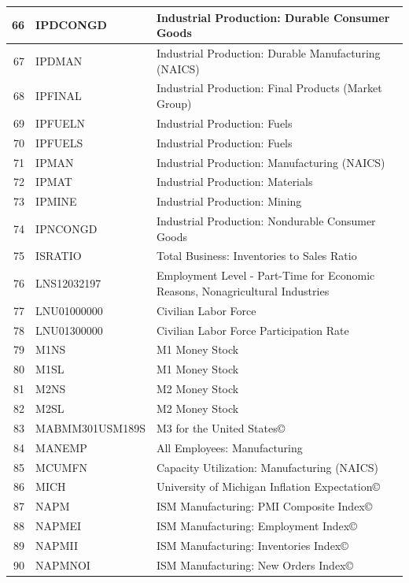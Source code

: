 \documentclass[12pt]{article}
\begin{document}
\begin{table}[ht]
\label{fred data 4}
\centering
\begin{tabular}{r|p{4cm}p{11cm}}
	\hline
	66 & IPDCONGD & Industrial Production: Durable Consumer Goods \\ 
	\hline
	67 & IPDMAN & Industrial Production: Durable Manufacturing (NAICS) \\ 
	\hline
	68 & IPFINAL & Industrial Production: Final Products (Market Group) \\ 
	\hline
	69 & IPFUELN & Industrial Production: Fuels \\ 
	\hline
	70 & IPFUELS & Industrial Production: Fuels \\ 
	\hline
	71 & IPMAN & Industrial Production: Manufacturing (NAICS) \\ 
	\hline
	72 & IPMAT & Industrial Production: Materials \\ 
	\hline
	73 & IPMINE & Industrial Production: Mining \\ 
	\hline
	74 & IPNCONGD & Industrial Production: Nondurable Consumer Goods \\ 
	\hline
	75 & ISRATIO & Total Business: Inventories to Sales Ratio \\ 
	\hline
	76 & LNS12032197 & Employment Level - Part-Time for Economic Reasons, Nonagricultural Industries \\ 
	\hline
	77 & LNU01000000 & Civilian Labor Force \\ 
	\hline
	78 & LNU01300000 & Civilian Labor Force Participation Rate \\ 
	\hline
	79 & M1NS & M1 Money Stock \\ 
	\hline
	80 & M1SL & M1 Money Stock \\ 
	\hline
	81 & M2NS & M2 Money Stock \\ 
	\hline
	82 & M2SL & M2 Money Stock \\ 
	\hline
	83 & MABMM301USM189S & M3 for the United States© \\ 
	\hline
	84 & MANEMP & All Employees: Manufacturing \\ 
	\hline
	85 & MCUMFN & Capacity Utilization: Manufacturing (NAICS) \\ 
	\hline
	86 & MICH & University of Michigan Inflation Expectation© \\ 
	\hline
	87 & NAPM & ISM Manufacturing: PMI Composite Index© \\ 
	\hline
	88 & NAPMEI & ISM Manufacturing: Employment Index© \\ 
	\hline
	89 & NAPMII & ISM Manufacturing: Inventories Index© \\ 
	\hline
	90 & NAPMNOI & ISM Manufacturing: New Orders Index© \\ 
	\hline
\end{tabular}
\end{table}
\end{document}

